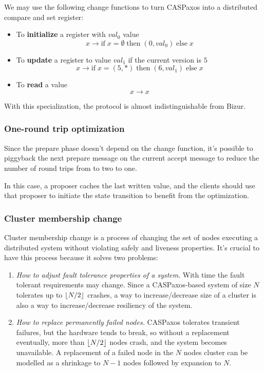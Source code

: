 \documentclass[12pt]{article}
\theoremstyle{definition}
\DeclarePairedDelimiter{\floor}{\lfloor}{\rfloor}
\begin{document}
We may use the following change functions to turn CASPaxos into a distributed compare and set register:
\begin{itemize}
  \item To {\bf initialize} a register with $val_0$ value
  $$x \to \mbox{if}\; x = \emptyset \;\mbox{then}\; (0, val_0)\; \mbox{else}\; x$$
  
  \item To {\bf update} a register to value $val_1$ if the current version is $5$
  $$x \to \mbox{if}\; x = (5, \ast) \;\mbox{then}\; (6, val_1)\; \mbox{else}\; x$$
  
  \item To {\bf read} a value
  $$x \to x$$
\end{itemize}

With this specialization, the protocol is almost indistinguishable from Bizur\cite{bizur}.

\subsubsection{One-round trip optimization}

Since the prepare phase doesn't depend on the change function, it's possible to piggyback the next prepare message on the current accept message to reduce the number of round trips from to two to one.

In this case, a proposer caches the last written value, and the clients should use that proposer to initiate the state transition to benefit from the optimization.

\subsubsection{Cluster membership change}

Cluster membership change is a process of changing the set of nodes executing a distributed system without violating safely and liveness properties. It's crucial to have this process because it solves two problems:

\begin{enumerate}
  \item {\it How to adjust fault tolerance properties of a system}. With time the fault tolerant requirements may change. Since a CASPaxos-based system of size $N$ tolerates up to $\floor{N/2}$ crashes, a way to increase/decrease size of a cluster is also a way to increase/decrease resiliency of the system.

  \item {\it How to replace permanently failed nodes.} CASPaxos tolerates transient failures, but the hardware tends to break, so without a replacement eventually, more than $\floor{N/2}$ nodes crash, and the system becomes unavailable. A replacement of a failed node in the $N$ nodes cluster can be modelled as a shrinkage to $N-1$ nodes followed by expansion to $N$.
\end{enumerate}
\end{document}
